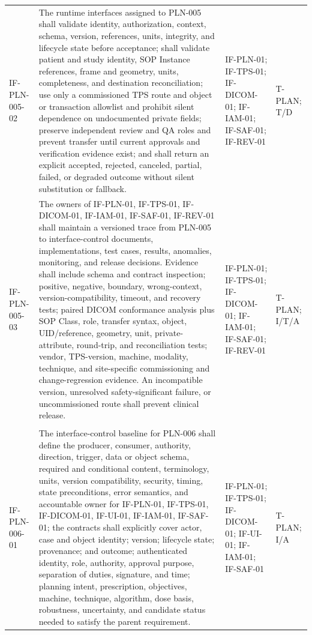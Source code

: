 \documentclass[11pt,letterpaper]{article}
\begin{document}
\begin{scriptsize}
\begin{longtable}{@{}L{0.14\textwidth}L{0.49\textwidth}L{0.19\textwidth}L{0.10\textwidth}@{}}
\addlinespace[2pt]
\mbox{IF-PLN-005-02} & The runtime interfaces assigned to PLN-005 shall validate identity, authorization, context, schema, version, references, units, integrity, and lifecycle state before acceptance; shall validate patient and study identity, SOP Instance references, frame and geometry, units, completeness, and destination reconciliation; use only a commissioned TPS route and object or transaction allowlist and prohibit silent dependence on undocumented private fields; preserve independent review and QA roles and prevent transfer until current approvals and verification evidence exist; and shall return an explicit accepted, rejected, canceled, partial, failed, or degraded outcome without silent substitution or fallback. & IF-PLN-01; IF-TPS-01; IF-DICOM-01; IF-IAM-01; IF-SAF-01; IF-REV-01 & T-PLAN; T\slash\allowbreak{}D \\
\addlinespace[2pt]
\mbox{IF-PLN-005-03} & The owners of IF-PLN-01, IF-TPS-01, IF-DICOM-01, IF-IAM-01, IF-SAF-01, IF-REV-01 shall maintain a versioned trace from PLN-005 to interface-control documents, implementations, test cases, results, anomalies, monitoring, and release decisions. Evidence shall include schema and contract inspection; positive, negative, boundary, wrong-context, version-compatibility, timeout, and recovery tests; paired DICOM conformance analysis plus SOP Class, role, transfer syntax, object, UID\slash\allowbreak{}reference, geometry, unit, private-attribute, round-trip, and reconciliation tests; vendor, TPS-version, machine, modality, technique, and site-specific commissioning and change-regression evidence. An incompatible version, unresolved safety-significant failure, or uncommissioned route shall prevent clinical release. & IF-PLN-01; IF-TPS-01; IF-DICOM-01; IF-IAM-01; IF-SAF-01; IF-REV-01 & T-PLAN; I\slash\allowbreak{}T\slash\allowbreak{}A \\
\addlinespace[2pt]
 \\
\addlinespace[2pt]
\mbox{IF-PLN-006-01} & The interface-control baseline for PLN-006 shall define the producer, consumer, authority, direction, trigger, data or object schema, required and conditional content, terminology, units, version compatibility, security, timing, state preconditions, error semantics, and accountable owner for IF-PLN-01, IF-TPS-01, IF-DICOM-01, IF-UI-01, IF-IAM-01, IF-SAF-01; the contracts shall explicitly cover actor, case and object identity; version; lifecycle state; provenance; and outcome; authenticated identity, role, authority, approval purpose, separation of duties, signature, and time; planning intent, prescription, objectives, machine, technique, algorithm, dose basis, robustness, uncertainty, and candidate status needed to satisfy the parent requirement. & IF-PLN-01; IF-TPS-01; IF-DICOM-01; IF-UI-01; IF-IAM-01; IF-SAF-01 & T-PLAN; I\slash\allowbreak{}A \\

\end{longtable}
\end{scriptsize}
\end{document}
